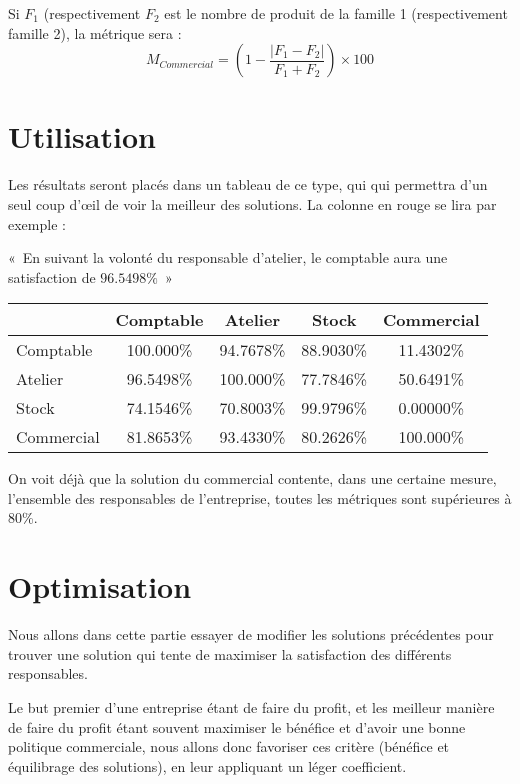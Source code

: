 Si $F_1$ (respectivement $F_2$ est le nombre de produit de la famille 1
(respectivement famille 2), la métrique sera :
$$
M_{Commercial} = \left( 1 - \frac{|F_1 - F_2|}{F_1 + F_2} \right) \times 100
$$

\section{Utilisation}
Les résultats seront placés dans un tableau de ce type, qui qui permettra d'un
seul coup d'œil de voir la meilleur des solutions.
La colonne en rouge se lira par exemple : 
\begin{center}
«~En suivant la volonté du responsable d'atelier, le comptable aura une
satisfaction de $96.5498\%$~»
\end{center}

    \begin{center}
	\begin{tabular}{|l|c|c|c|c|}
	    \hline
	    \cellcolor[gray]{0.9} & Comptable& Atelier & Stock & Commercial  \\
	    \hline
	    Comptable & 100.000\% & 94.7678\% & 88.9030\% & 11.4302\% \\
	    \hline
	    Atelier   & \cellcolor{red}96.5498\% & 100.000\% & 77.7846\% & 50.6491\% \\
	    \hline
	    Stock     & 74.1546\% & 70.8003\% & 99.9796\% & 0.00000\% \\
	    \hline
	    Commercial& 81.8653\% & 93.4330\% & 80.2626\% & 100.000\% \\
	    \hline
	\end{tabular}
    \end{center}

On voit déjà que la solution du commercial contente, dans une certaine mesure,
l'ensemble des responsables de l'entreprise, toutes les métriques sont
supérieures à 80\%.

\section{Optimisation}
Nous allons dans cette partie essayer de modifier les solutions précédentes
pour trouver une solution qui tente de maximiser la satisfaction des différents
responsables.

Le but premier d'une entreprise étant de faire du profit, et les meilleur 
manière de faire du profit étant souvent maximiser le bénéfice et d'avoir une
bonne politique commerciale, nous allons donc favoriser ces critère (bénéfice et
équilibrage des solutions), en leur appliquant un léger coefficient.

